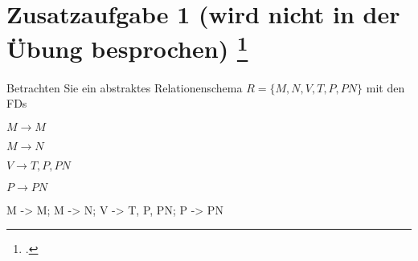 \documentclass{lehramt-informatik-aufgabe}
\begin{document}

\section{Zusatzaufgabe 1 (wird nicht in der Übung
besprochen)
\footcite{db:pdf:tum:uebung-08}}

Betrachten Sie ein abstraktes Relationenschema $R = \{M, N, V, T, P,
PN\}$ mit den FDs

\begin{compactitem}
\item $M \rightarrow M$
\item $M \rightarrow N$
\item $V \rightarrow T, P, PN$
\item $P \rightarrow PN$
\end{compactitem}

\begin{liFunktionaleAbhaengigkeiten}
M -> M;
M -> N;
V -> T, P, PN;
P -> PN
\end{liFunktionaleAbhaengigkeiten}
\end{document}
